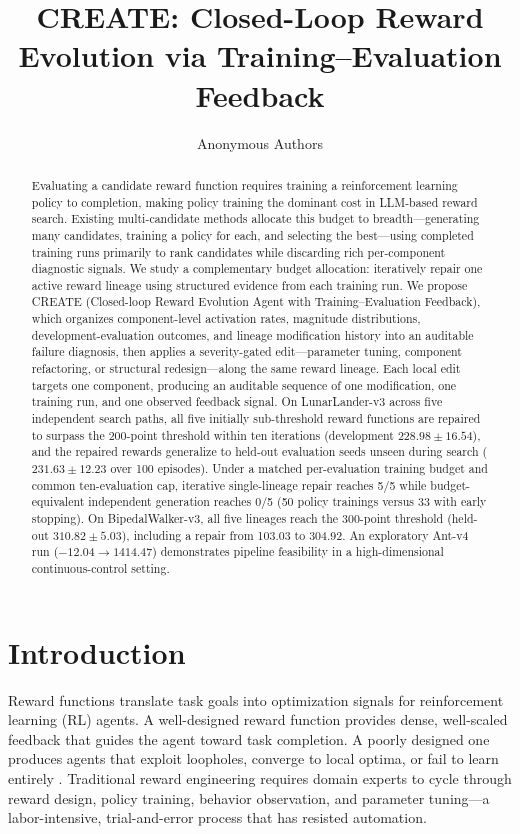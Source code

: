 \documentclass[letterpaper,twocolumn,10pt]{article}
\title{CREATE: Closed-Loop Reward Evolution via Training--Evaluation Feedback}
\author{Anonymous Authors}
\begin{document}
\maketitle

\begin{abstract}
Evaluating a candidate reward function requires training a reinforcement learning policy to completion, making policy training the dominant cost in LLM-based reward search. Existing multi-candidate methods allocate this budget to breadth---generating many candidates, training a policy for each, and selecting the best---using completed training runs primarily to rank candidates while discarding rich per-component diagnostic signals. We study a complementary budget allocation: iteratively repair one active reward lineage using structured evidence from each training run.
We propose CREATE (Closed-loop Reward Evolution Agent with Training--Evaluation Feedback), which organizes component-level activation rates, magnitude distributions, development-evaluation outcomes, and lineage modification history into an auditable failure diagnosis, then applies a severity-gated edit---parameter tuning, component refactoring, or structural redesign---along the same reward lineage. Each local edit targets one component, producing an auditable sequence of one modification, one training run, and one observed feedback signal.
On LunarLander-v3 across five independent search paths, all five initially sub-threshold reward functions are repaired to surpass the 200-point threshold within ten iterations (development $228.98 \pm 16.54$), and the repaired rewards generalize to held-out evaluation seeds unseen during search ($231.63 \pm 12.23$ over 100 episodes). Under a matched per-evaluation training budget and common ten-evaluation cap, iterative single-lineage repair reaches 5/5 while budget-equivalent independent generation reaches 0/5 (50 policy trainings versus 33 with early stopping). On BipedalWalker-v3, all five lineages reach the 300-point threshold (held-out $310.82 \pm 5.03$), including a repair from 103.03 to 304.92. An exploratory Ant-v4 run ($-12.04 \rightarrow 1414.47$) demonstrates pipeline feasibility in a high-dimensional continuous-control setting.
\end{abstract}

\section{Introduction}

Reward functions translate task goals into optimization signals for reinforcement learning (RL) agents. A well-designed reward function provides dense, well-scaled feedback that guides the agent toward task completion. A poorly designed one produces agents that exploit loopholes, converge to local optima, or fail to learn entirely \cite{ng1999policy,singh2010intrinsically}. Traditional reward engineering requires domain experts to cycle through reward design, policy training, behavior observation, and parameter tuning---a labor-intensive, trial-and-error process that has resisted automation.
\end{document}
